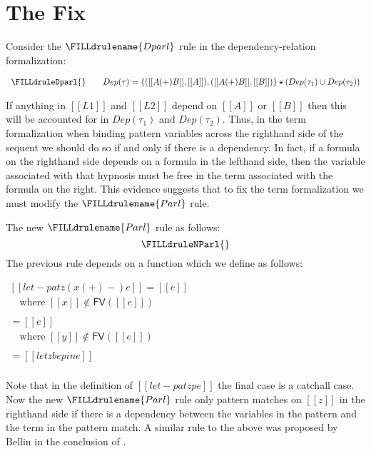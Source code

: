 \documentclass{article}
\begin{document}
\section{The Fix}
\label{sec:the_fix}
Consider the $\FILLdrulename{Dparl}$ rule in the dependency-relation
formalization:
\begin{center}
  \begin{math}
    \begin{array}{lll}
      \FILLdruleDparl{}
      && Dep(\tau) = \{([[A (+) B]], [[A]]), ([[A (+) B]], [[B]])\}
      \star (Dep(\tau_1) \cup Dep(\tau_2))
    \end{array}
  \end{math}
\end{center}
If anything in $[[L1]]$ and $[[L2]]$ depend on $[[A]]$ or $[[B]]$ then
this will be accounted for in $Dep(\tau_1)$ and $Dep(\tau_2)$.  Thus,
in the term formalization when binding pattern variables across the
righthand side of the sequent we should do so if and only if there is
a dependency.  In fact, if a formula on the righthand side depends on
a formula in the lefthand side, then the variable associated with
that hypnosis must be free in the term associated with the formula on
the right.  This evidence suggests that to fix the term formalization
we must modify the $\FILLdrulename{Parl}$ rule.

The new $\FILLdrulename{Parl}$ rule as follows:
\[
\FILLdruleNParl{}
\]
The previous rule depends on a function which we define as follows:
\begin{center}
  \begin{math}
    \begin{array}{lll}      
      [[let-pat z (x (+) -) e]] = [[e]]\\
      \,\,\,\,\,\,\text{where } [[x]] \not\in \mathsf{FV}([[e]])\\
      & \\
      [[let-pat z (- (+) y) e]] = [[e]]\\
      \,\,\,\,\,\,\text{where } [[y]] \not\in \mathsf{FV}([[e]])\\
      & \\
      [[let-pat z p e]] = [[let z be p in e]]\\
    \end{array}
  \end{math}
\end{center}
Note that in the definition of $[[let-pat z p e]]$ the final case is a
catchall case.  Now the new $\FILLdrulename{Parl}$ rule only pattern
matches on $[[z]]$ in the righthand side if there is a dependency
between the variables in the pattern and the term in the pattern
match.  A similar rule to the above was proposed by Bellin in the
conclusion of \cite{Bierman:1996}.
\end{document}
